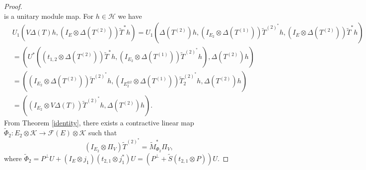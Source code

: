 \documentclass[12pt]{amsart}
\numberwithin{equation}{section}
\theoremstyle{plain}
\newcommand{\ot}{\otimes}
\newcommand{\wt}{\widetilde}
\newcommand{\wT}{\wt{T}}
\begin{document}
\begin{proof}
\[	\] is a unitary module map. For $h\in \mathcal{H}$ we have
	\begin{align*}
		&U_1(V\Delta(T)h,(I_{E}\ot \Delta(T^{(2)}))\wT^{*}h)=U_1(\Delta(T^{(2)})h,  (I_{E_2} \ot \Delta(T^{(1)}))\wT^{(2)^*}h,(I_{E}\ot \Delta(T^{(2)}))\wT^{*}h)\\&=(U^*((t_{1,2}\ot \Delta(T^{(2)}))\wT^{*}h,(I_{E_2}\ot \Delta(T^{(1)}))\wT^{(2)^*}h),\Delta(T^{(2)})h)\\&=((I_{E_2}\ot \Delta(T^{(2)}))\wT^{(2)^*}h,(I_{E_2^{\ot 2}} \ot \Delta(T^{(1)}))\wT_2^{(2)^*}h,\Delta(T^{(2)})h)\\&=((I_{E_2}\ot V\Delta(T))\wT^{(2)^*}h,\Delta(T^{(2)})h).
	\end{align*} From Theorem \ref{identity}, there exists a contractive linear map $\widetilde{\Phi}_2:E_2 \ot \mathcal{K}\to \mathcal{F}(E)\ot \mathcal{K}$ such that $$(I_{E_2}\ot \Pi_V)\wT^{(2)^*}=\widetilde{M}_{{\Phi}_2}^*\Pi_V,$$ where $\widetilde{\Phi}_2=P^{\perp}U+(I_{E}\ot j_1)(t_{2,1}\otimes j_1^*)U=(P^{\perp} + \widetilde{S}(t_{2,1}\otimes P))U.$ 


\end{proof}
\end{document}
